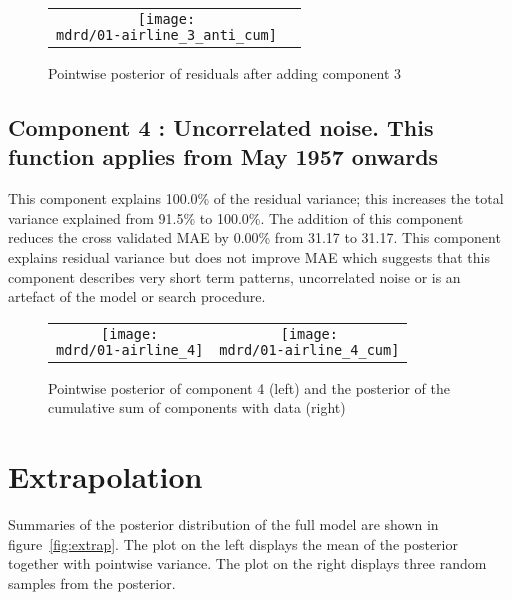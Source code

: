 \documentclass{article} %
\begin{document}
\begin{figure}[H]
\newcommand{\wmgd}{0.5\columnwidth}
\newcommand{\hmgd}{3.0cm}
\newcommand{\mdrd}{01-airline}
\newcommand{\mbm}{\hspace{-0.3cm}}
\begin{tabular}{cc}
\mbm \texttt{[image: \\mdrd/01-airline\_3\_anti\_cum]}
\end{tabular}
\caption{Pointwise posterior of residuals after adding component 3}
\label{fig:comp3}
\end{figure}

\subsection{Component 4 : Uncorrelated noise. This function applies from May 1957 onwards}



This component explains 100.0\% of the residual variance; this increases the total variance explained from 91.5\% to 100.0\%.
The addition of this component reduces the cross validated MAE by 0.00\% from 31.17 to 31.17.
This component explains residual variance but does not improve MAE which suggests that this component describes very short term patterns, uncorrelated noise or is an artefact of the model or search procedure.

\begin{figure}[H]
\newcommand{\wmgd}{0.5\columnwidth}
\newcommand{\hmgd}{3.0cm}
\newcommand{\mdrd}{01-airline}
\newcommand{\mbm}{\hspace{-0.3cm}}
\begin{tabular}{cc}
\mbm \texttt{[image: \\mdrd/01-airline\_4]} & \texttt{[image: \\mdrd/01-airline\_4\_cum]}
\end{tabular}
\caption{Pointwise posterior of component 4 (left) and the posterior of the cumulative sum of components with data (right)}
\label{fig:comp4}
\end{figure}

\section{Extrapolation}
\label{sec:extrap}

Summaries of the posterior distribution of the full model are shown in figure~\ref{fig:extrap}.
The plot on the left displays the mean of the posterior together with pointwise variance.
The plot on the right displays three random samples from the posterior.
\end{document}
